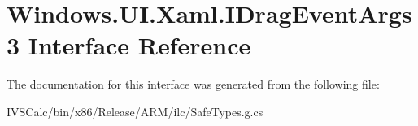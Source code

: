 \hypertarget{interface_windows_1_1_u_i_1_1_xaml_1_1_i_drag_event_args3}{}\section{Windows.\+U\+I.\+Xaml.\+I\+Drag\+Event\+Args3 Interface Reference}
\label{interface_windows_1_1_u_i_1_1_xaml_1_1_i_drag_event_args3}


The documentation for this interface was generated from the following file\+:\begin{DoxyCompactItemize}
\item 
I\+V\+S\+Calc/bin/x86/\+Release/\+A\+R\+M/ilc/Safe\+Types.\+g.\+cs\end{DoxyCompactItemize}
